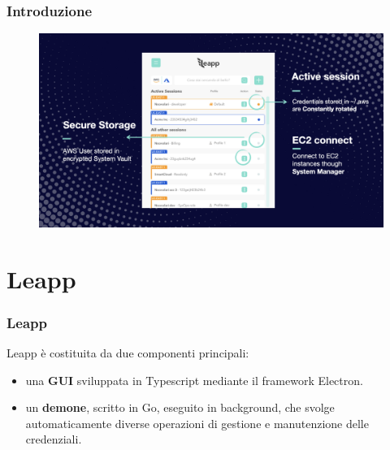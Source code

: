 \documentclass{beamer}
\begin{document}
\begin{frame}
 \frametitle{Introduzione}
  \begin{figure}
   \centering
   \includegraphics[width=1\textwidth]{Risorse/leapp_presentazione.jpeg}
  \end{figure}
\end{frame}
%
%
\section{Leapp}
\begin{frame}
 \frametitle{Leapp}
 Leapp è costituita da due componenti principali:
 \begin{itemize}
  \item<2-> una \textbf{GUI} sviluppata in Typescript mediante il framework Electron.
  \item<3-> un \textbf{demone}, scritto in Go, eseguito in background, che svolge automaticamente diverse operazioni di gestione e manutenzione delle credenziali.
 \end{itemize}
\end{frame}
\end{document}
